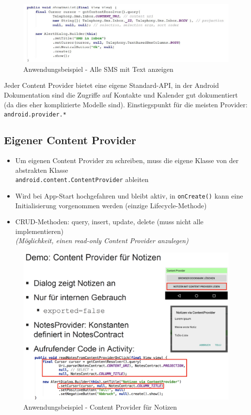 \documentclass[a4paper]{article}
\begin{document}
\begin{figure}[htb!]
	\centering
	\includegraphics[width=\textwidth]{img/content_sms.jpg}
	\caption{Anwendungsbeispiel - Alle SMS mit Text anzeigen}
\end{figure}

Jeder Content Provider bietet eine eigene Standard-API, in der Android Dokumentation sind die Zugriffe auf Kontakte und Kalender gut dokumentiert (da dies eher komplizierte Modelle sind). Einstiegspunkt für die meisten Provider: \texttt{android.provider.*}

\subsection{Eigener Content Provider}

\begin{itemize}
	\item Um eigenen Content Provider zu schreiben, muss die eigene Klasse von der abstrakten Klasse\\ \texttt{android.content.ContentProvider} ableiten
	\item Wird bei App-Start hochgefahren und bleibt aktiv, in \texttt{onCreate()} kann eine Initialisierung vorgenommen werden (einzige Lifecycle-Methode)
	\item CRUD-Methoden: query, insert, update, delete (muss nicht alle implementieren)\\
	\textit{(Möglichkeit, einen read-only Content Provider anzulegen)}
\end{itemize}

\begin{figure}[htb!]
	\centering
	\includegraphics[width=.75\textwidth]{img/content_notes.png}
	\caption{Anwendungsbeispiel - Content Provider für Notizen}
\end{figure}
\end{document}
